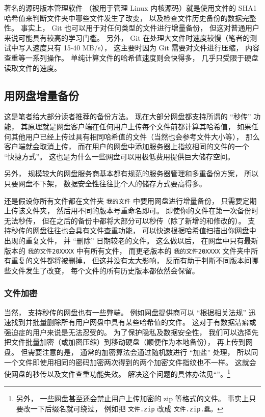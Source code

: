 著名的源码版本管理软件  （被用于管理 Linux 内核源码）就是使用文件的 SHA1 哈希值来判断文件夹中哪些文件发生了改变， 以及检查文件历史备份的数据完整性。 事实上， Git 也可以用于对任何类型的文件进行增量备份， 但这对普通用户来说可能具有较高的学习门槛。 另外， Git 在处理大文件时速度较慢（笔者的测试中写入速度只有 15-40 MB/s）， 这主要时因为 Git 需要对文件进行压缩， 内容查重等一系列操作。 单纯计算文件的哈希值速度则会快得多， 几乎只受限于硬盘读取文件的速度。

\subsection{用网盘增量备份}
这是笔者给大部分读者推荐的备份方法。 现在大部分网盘都支持所谓的 “秒传” 功能， 其原理就是网盘客户端在任何用户上传每个文件前都计算其哈希值， 如果任何其他用户已经上传过具有相同哈希值的文件（当然也会参考文件大小等）， 那么客户端就会取消上传， 而在用户的网盘中添加服务器上指纹相同的文件的一个 “快捷方式”。 这也是为什么一些网盘可以用极低费用提供巨大储存空间。

另外， 规模较大的网盘服务商基本都有规范的服务器管理和多重备份方案， 所以只要网盘不下架， 数据安全性往往比个人的储存方式要高得多。

还是假设你所有文件都在文件夹 \verb|我的文件| 中要用网盘进行增量备份， 只需要定期上传该文件夹， 然后用不同的版本号重命名即可。 即使你的文件在第一次备份时无法秒传， 但在之后的备份中都将大部分可以秒传（除了新增的和修改的）。 支持秒传的网盘往往也会具有文件查重功能， 可以快速根据哈希值扫描出你网盘中出现的重复文件， 并 “删除” 日期较老的文件。 这么做以后， 在网盘中只有最新版本的 \verb|我的文件20XXXX| 中有所有文件， 而更老版本的 \verb|我的文件20XXXX| 文件夹中所有重复的文件都将被删掉， 但这并没有太大影响， 反而有助于判断不同版本间哪些文件发生了改变， 每个文件的所有历史版本都依然会保留。

\subsubsection{文件加密}
当然， 支持秒传的网盘也有一些弊端。 例如网盘提供商可以 “根据相关法规” 迅速找到并批量删除所有用户网盘中具有某些哈希值的文件。 这对于有数据洁癖或强迫症的用户来说是无法忍受的。 为了保护隐私及数据安全性， 我们可以选择先把文件批量加密（或加密压缩）到移动硬盘（顺便作为本地备份）， 再上传到网盘。 但需要注意的是， 通常的加密算法会通过随机数进行 “加盐” 处理， 所以同一个文件即使用相同的密码加密两次得到的两个加密文件指纹也不一样。 这就会使网盘的秒传以及文件查重功能失效。 解决这个问题的具体办法见“”。\footnote{另外， 一些网盘甚至还会禁止用户上传加密的 zip 等格式的文件。 事实上只要改一下后缀名就可绕过， 例如把 \verb|文件.zip| 改成 \verb|文件.zip.蠢|。}

